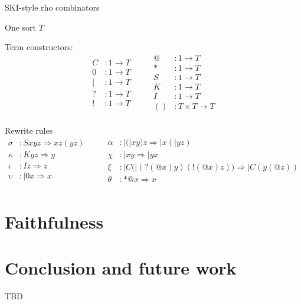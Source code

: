 \documentclass{llncs}
\begin{document}


SKI-style rho combinators

One sort $T$

Term constructors:
\[\begin{array}{rl}
  C &: 1 \to T \\
  0 &: 1 \to T \\
  | &: 1 \to T \\
  ? &: 1 \to T \\
  ! &: 1 \to T \\
\end{array} \quad \quad
\begin{array}{rl}
  @ &: 1 \to T \\
  * &: 1 \to T \\
  S &: 1 \to T \\
  K &: 1 \to T \\
  I &: 1 \to T \\
  () &: T \times T \to T \\
\end{array}\]

Rewrite rules
\[\begin{array}{rl}
  \sigma &: Sxyz \Rightarrow xz(yz) \\
  \kappa &: Kyz \Rightarrow y \\
  \iota &: Iz \Rightarrow z \\
  \upsilon &: |0x \Rightarrow x \\
\end{array} \quad \quad
\begin{array}{rl}
  \alpha &: |(|xy)z \Rightarrow |x(|yz) \\
  \chi &: |xy \Rightarrow |yx \\
  \xi &: |C(|(?(@x)y)(!(@x)z)) \Rightarrow |C(y(@z)) \\
  \theta &: *@x \Rightarrow x \\
\end{array}\]

\section{Faithfulness}

\section{Conclusion and future work}
TBD



\end{document}
